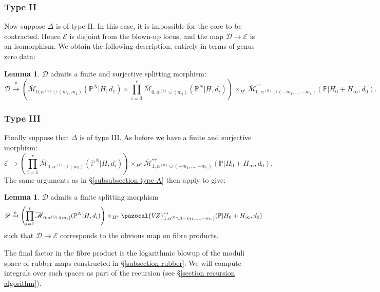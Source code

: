 \documentclass[11pt]{amsart}
\newcommand{\PP}{\mathbb P}
\newcommand{\VZ}{\pazocal{V\!Z}}
\renewcommand{\to}{\rightarrow}
\newcommand{\Mcal}{\mathcal{M}}
\newcommand{\Dcal}{\mathcal{D}}
\newcommand{\Ecal}{\mathcal{E}}
\newcommand{\ol}[1]{\overline{#1}}
\theoremstyle{definition}
\newtheorem{lemma}[thm]{Lemma}
\theoremstyle{definition}
\begin{document}
\subsubsection{Type II}
Now suppose $\Delta$ is of type II. In this case, it is impossible for the core to be contracted. Hence $\Ecal$ is disjoint from the blown-up locus, and the map $\Dcal \to \Ecal$ is an isomorphism. We obtain the following description, entirely in terms of genus zero data:
\begin{lemma} $\Dcal$ admits a finite and surjective splitting morphism:
\begin{equation*} \Dcal \xrightarrow{\rho} \left(\ol\Mcal_{0,\alpha^{(1)}\cup(m_1,m_2)}(\PP^N|H,d_1)\times\prod_{i=3}^r \ol\Mcal_{0,\alpha^{(i)}\cup(m_i)}(\PP^N|H,d_i)\right) \times_{H^r} \ol\Mcal^{\leftrightarrow}_{0,\alpha^{(0)}\cup(-m_1,\ldots,-m_r)}(\mathbb P|H_0+H_\infty,d_0).\end{equation*}\end{lemma}

\subsubsection{Type III} \label{subsubsection type C+} Finally suppose that $\Delta$ is of type III. As before we have a finite and surjective morphism:
\begin{equation*} \Ecal \to  \left( \prod_{i=1}^r \ol\Mcal_{0,\alpha^{(i)}\cup(m_i)}(\PP^N|H,d_i) \right) \times_{H^r} \ol\Mcal^{\leftrightarrow}_{1,\alpha^{(0)}\cup(-m_1,\ldots,-m_r)}(\mathbb{P}|H_0+H_\infty,d_0). \end{equation*}
The same arguments as in \S \ref{subsubsection type A} then apply to give:
\begin{lemma} $\Dcal$ admits a finite splitting morphism
\begin{equation*}\Dcal \xrightarrow{\rho} \left( \prod_{i=1}^r \ol\Mcal_{0,\alpha^{(i)}\cup(m_i)}(\PP^N|H,d_i) \right) \times_{H^r} \VZ^{\leftrightarrow}_{1,\alpha^{(0)}\cup(-m_1,\ldots,-m_r)}(\mathbb{P}|H_0+H_\infty,d_0)\end{equation*}
such that $\Dcal \to \Ecal$ corresponds to the obvious map on fibre products.\end{lemma}
\noindent The final factor in the fibre product is the logarithmic blowup of the moduli space of rubber maps constructed in \S \ref{subsection rubber}. We will compute integrals over such spaces as part of the recursion (see \S \ref{section recursion algorithm}).
\end{document}
